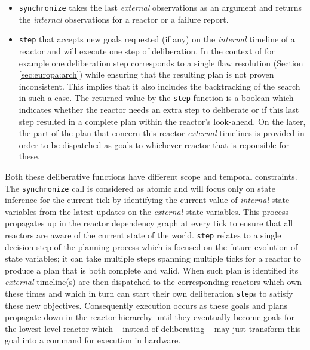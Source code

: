 \begin{itemize}

\item \texttt{synchronize} takes the last {\em external} observations
  as an argument and returns the {\em internal} observations for a
  reactor or a failure report.

\item \texttt{step} that accepts new goals requested (if any) on the
  {\em internal} timeline of a reactor and will execute one step of
  deliberation. In the context of \eu for example one deliberation
  step corresponds to a single flaw resolution (Section
  \ref{sec:europa:arch}) while ensuring that the resulting plan is not
  proven inconsistent. This implies that it also includes the
  backtracking of the search in such a case.  The returned value by
  the \texttt{step} function is a boolean which indicates whether the
  reactor needs an extra step to deliberate or if this last step
  resulted in a complete plan within the reactor's look-ahead. On the
  later, the part of the plan that concern this reactor {\em external}
  timelines is provided in order to be dispatched as goals to
  whichever reactor that is reponsible for these. 
\end{itemize}

Both these deliberative functions have different scope and temporal
constraints. The \texttt{synchronize} call is considered as atomic and
will focus only on state inference for the current tick by identifying
the current value of {\em internal} state variables from the latest
updates on the {\em external} state variables. This process propagates
up in the reactor dependency graph at every tick to ensure that all
reactors are aware of the current state of the world. \texttt{step}
relates to a single decision step of the planning process which is
focused on the future evolution of state variables; it can take
multiple steps spanning multiple ticks for a reactor to produce a plan
that is both complete and valid. When such plan is identified
 its {\em external}
timeline(s) are then dispatched to the corresponding reactors which
own these times and which in turn can start their own deliberation
\texttt{step}s to satisfy these new objectives. Consequently execution
occurs as these goals and plans propagate down in the reactor
hierarchy until they eventually become goals for the lowest level
reactor which -- instead of deliberating -- may just transform this
goal into a command for execution in hardware.

